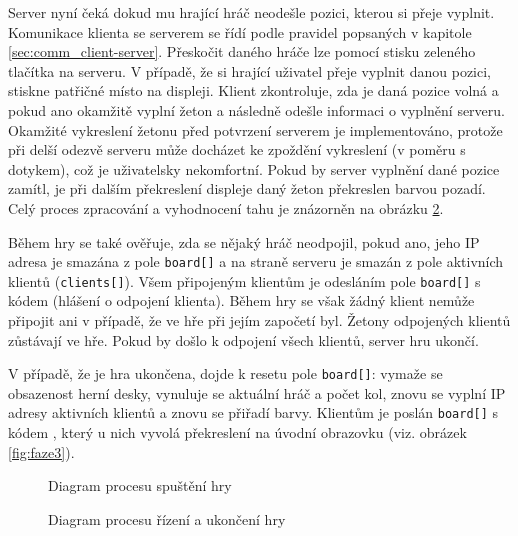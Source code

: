 Server nyní čeká dokud mu hrající hráč neodešle pozici, kterou si přeje vyplnit. Komunikace klienta se serverem se řídí podle pravidel popsaných v kapitole \ref{sec:comm_client-server}. Přeskočit daného hráče lze pomocí stisku zeleného tlačítka na serveru. V případě, že si hrající uživatel přeje vyplnit danou pozici, stiskne patřičné místo na displeji. Klient zkontroluje, zda je daná pozice volná a pokud ano okamžitě vyplní žeton a následně odešle informaci o vyplnění serveru. Okamžité vykreslení žetonu před potvrzení serverem je implementováno, protože při delší odezvě serveru může docházet ke zpoždění vykreslení (v poměru s dotykem), což je uživatelsky nekomfortní. Pokud by server vyplnění dané pozice zamítl, je při dalším překreslení displeje daný žeton překreslen barvou pozadí. Celý proces zpracování a vyhodnocení tahu je znázorněn na obrázku \ref{fig:flow:gameFlow}.

Během hry se také ověřuje, zda se nějaký hráč neodpojil, pokud ano, jeho IP adresa je smazána z pole \texttt{board[]} a na straně serveru je smazán z pole aktivních klientů (\texttt{clients[]}). Všem připojeným klientům je odesláním pole \texttt{board[]} s kódem  (hlášení o odpojení klienta). Během hry se však žádný klient nemůže připojit ani v případě, že ve hře při jejím započetí byl. Žetony odpojených klientů zůstávají ve hře. Pokud by došlo k odpojení všech klientů, server hru ukončí.

V případě, že je hra ukončena, dojde k resetu pole \texttt{board[]}: vymaže se obsazenost herní desky, vynuluje se aktuální hráč a počet kol, znovu se vyplní IP adresy aktivních klientů a znovu se přiřadí barvy. Klientům je poslán \texttt{board[]} s kódem , který u nich vyvolá překreslení na úvodní obrazovku (viz. obrázek \ref{fig:faze3}).

\begin{figure}
  \centering
  
  \caption{\label{fig:flow:gameBegin} Diagram procesu spuštění hry}
\end{figure}


\begin{figure}
  \centering
  
  \caption{\label{fig:flow:gameFlow} Diagram procesu řízení a ukončení hry}
\end{figure}


